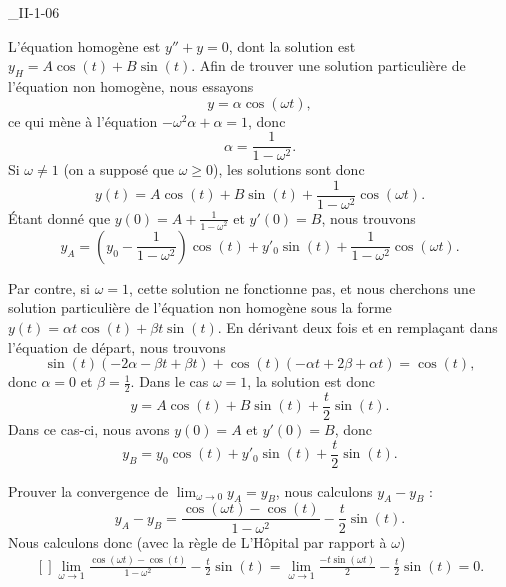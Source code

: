 

\begin{corrige}{_II-1-06}

L'équation homogène est $y''+y=0$, dont la solution est $y_H=A\cos(t)+B\sin(t)$. Afin de trouver une solution particulière de l'équation non homogène, nous essayons
\begin{equation}
	y=\alpha\cos(\omega t),
\end{equation}
ce qui mène à l'équation $-\omega^2\alpha+\alpha=1$, donc
\begin{equation}
	\alpha=\frac{1}{ 1-\omega^2 }.
\end{equation}
Si $\omega\neq 1$ (on a supposé que $\omega\geq0$), les solutions sont donc
\begin{equation}
	y(t)=A\cos(t)+B\sin(t)+\frac{1}{ 1-\omega^2 }\cos(\omega t).
\end{equation}
Étant donné que $y(0)=A+\frac{1}{ 1-\omega^2 }$ et $y'(0)=B$, nous trouvons
\begin{equation}
	y_A=\left( y_0-\frac{1}{ 1-\omega^2 } \right)\cos(t)+y'_0\sin(t)+\frac{1}{ 1-\omega^2 }\cos(\omega t).
\end{equation}

Par contre, si $\omega=1$, cette solution ne fonctionne pas, et nous cherchons une solution particulière de l'équation non homogène sous la forme $y(t)=\alpha t\cos(t)+\beta t\sin(t)$. En dérivant deux fois et en remplaçant dans l'équation de départ, nous trouvons
\begin{equation}
	\sin(t)(-2\alpha-\beta t+\beta t)+\cos(t)(-\alpha t+2\beta+\alpha t)=\cos(t),
\end{equation}
donc $\alpha=0$ et $\beta=\frac{ 1 }{2}$. Dans le cas $\omega=1$, la solution est donc
\begin{equation}
	y=A\cos(t)+B\sin(t)+\frac{ t }{ 2 }\sin(t).
\end{equation}
Dans ce cas-ci, nous avons $y(0)=A$ et $y'(0)=B$, donc
\begin{equation}
	y_B=y_0\cos(t)+y'_0\sin(t)+\frac{ t }{2}\sin(t).
\end{equation}

Prouver la convergence de $\lim_{\omega\to 0}y_A=y_B$, nous calculons $y_A-y_B$ :
\begin{equation}
	y_A-y_B=\frac{ \cos(\omega t)-\cos(t) }{ 1-\omega^2 }-\frac{ t }{2}\sin(t).
\end{equation}
Nous calculons donc (avec la règle de L'Hôpital par rapport à $\omega$)
\begin{equation}
	\begin{aligned}[]
		\lim_{\omega\to 1}\frac{ \cos(\omega t)-\cos(t) }{ 1-\omega^2 }-\frac{ t }{2}\sin(t)=\lim_{\omega\to 1}\frac{ -t\sin(\omega t) }{2}-\frac{ t }{2}\sin(t)=0.
	\end{aligned}
\end{equation}

\end{corrige}
